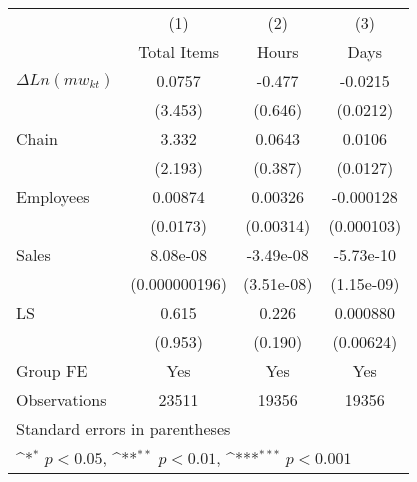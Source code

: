 {
\def\sym#1{\ifmmode^{#1}\else\(^{#1}\)\fi}
\begin{tabular}{l*{3}{c}}
\hline\hline
                    &\multicolumn{1}{c}{(1)}&\multicolumn{1}{c}{(2)}&\multicolumn{1}{c}{(3)}\\
                    &\multicolumn{1}{c}{Total Items}&\multicolumn{1}{c}{Hours}&\multicolumn{1}{c}{Days}\\
\hline
$\Delta Ln(mw_{kt}) $&      0.0757         &      -0.477         &     -0.0215         \\
                    &     (3.453)         &     (0.646)         &    (0.0212)         \\
[1em]
Chain               &       3.332         &      0.0643         &      0.0106         \\
                    &     (2.193)         &     (0.387)         &    (0.0127)         \\
[1em]
Employees           &     0.00874         &     0.00326         &   -0.000128         \\
                    &    (0.0173)         &   (0.00314)         &  (0.000103)         \\
[1em]
Sales               &    8.08e-08         &   -3.49e-08         &   -5.73e-10         \\
                    &(0.000000196)         &  (3.51e-08)         &  (1.15e-09)         \\
[1em]
LS                  &       0.615         &       0.226         &    0.000880         \\
                    &     (0.953)         &     (0.190)         &   (0.00624)         \\
\hline
Group FE        &       Yes         &       Yes         &       Yes         \\
Observations        &       23511         &       19356         &       19356         \\
\hline\hline
\multicolumn{4}{l}{\footnotesize Standard errors in parentheses}\\
\multicolumn{4}{l}{\footnotesize \sym{*} \(p<0.05\), \sym{**} \(p<0.01\), \sym{***} \(p<0.001\)}\\
\end{tabular}
}
